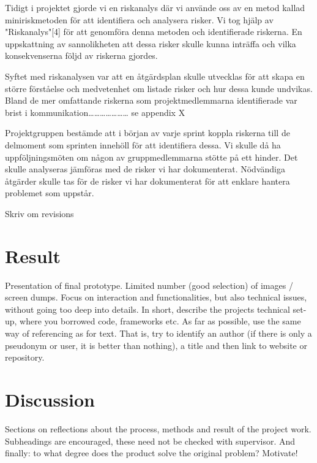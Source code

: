 \documentclass[12pt]{article}
\begin{document}
Tidigt i projektet gjorde vi en riskanalys där vi använde oss av en metod kallad miniriskmetoden för att identifiera och analysera risker. Vi tog hjälp av "Riskanalys"[4] för att genomföra denna metoden och identifierade riskerna. En uppskattning av sannolikheten att dessa risker skulle kunna inträffa och vilka konsekvenserna följd av riskerna gjordes.

Syftet med riskanalysen var att en åtgärdsplan skulle utvecklas för att skapa en större förståelse och medvetenhet om listade risker och hur dessa kunde undvikas. Bland de mer omfattande riskerna som projektmedlemmarna identifierade var brist i kommunikation…………………
se appendix X

Projektgruppen bestämde att i början av varje sprint koppla riskerna till de delmoment som sprinten innehöll för att identifiera dessa. Vi skulle då ha uppföljningsmöten om någon av gruppmedlemmarna stötte på ett hinder. Det skulle analyseras jämföras med de risker vi har dokumenterat. Nödvändiga åtgärder skulle tas för de risker vi har dokumenterat för att enklare hantera problemet som uppstår.







Skriv om revisions





\section{Result}
Presentation of final prototype. Limited number (good selection) of images / screen dumps. Focus on interaction and functionalities, but also technical issues, without going too deep into details. In short, describe the projects technical set-up, where you borrowed code, frameworks etc. As far as possible, use the same way of referencing as for text. That is, try to identify an author (if there is only a pseudonym or user, it is better than nothing), a title and then link to website or repository.

\section{Discussion}
Sections on reflections about the process, methods and result of the project work. Subheadings are encouraged, these need not be checked with supervisor. And finally: to what degree does the product solve the original problem? Motivate!
\end{document}
